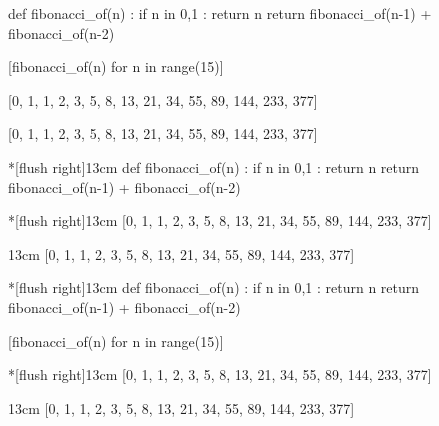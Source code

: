 \documentclass[english,11pt,a4paper]{article}
\begin{document}
\begin{NotebookIn}{\linewidth}
def fibonacci_of(n) :
	if n in {0,1} :
		return n
	return fibonacci_of(n-1) + fibonacci_of(n-2)

[fibonacci_of(n) for n in range(15)]
\end{NotebookIn}

\begin{NotebookOut}{\linewidth}
[0, 1, 1, 2, 3, 5, 8, 13, 21, 34, 55, 89, 144, 233, 377]
\end{NotebookOut}

\begin{NotebookConsole}{\linewidth}
[0, 1, 1, 2, 3, 5, 8, 13, 21, 34, 55, 89, 144, 233, 377]
\end{NotebookConsole}

\begin{codehigh}[language=latex/latex2,style/main=cyan!10,style/code=cyan!10]
\begin{NotebookIn}*[flush right]{13cm}
def fibonacci_of(n) :
  if n in {0,1} :
    return n
  return fibonacci_of(n-1) + fibonacci_of(n-2)

\end{NotebookIn}

\begin{NotebookOut}*[flush right]{13cm}
[0, 1, 1, 2, 3, 5, 8, 13, 21, 34, 55, 89, 144, 233, 377]
\end{NotebookOut}

\begin{NotebookConsole}{13cm}
[0, 1, 1, 2, 3, 5, 8, 13, 21, 34, 55, 89, 144, 233, 377]
\end{NotebookConsole}
\end{codehigh}

\begin{NotebookIn}*[flush right]{13cm}
def fibonacci_of(n) :
	if n in {0,1} :
		return n
	return fibonacci_of(n-1) + fibonacci_of(n-2)

[fibonacci_of(n) for n in range(15)]
\end{NotebookIn}

\begin{NotebookOut}*[flush right]{13cm}
[0, 1, 1, 2, 3, 5, 8, 13, 21, 34, 55, 89, 144, 233, 377]
\end{NotebookOut}

\begin{NotebookConsole}{13cm}
[0, 1, 1, 2, 3, 5, 8, 13, 21, 34, 55, 89, 144, 233, 377]
\end{NotebookConsole}
\end{document}
